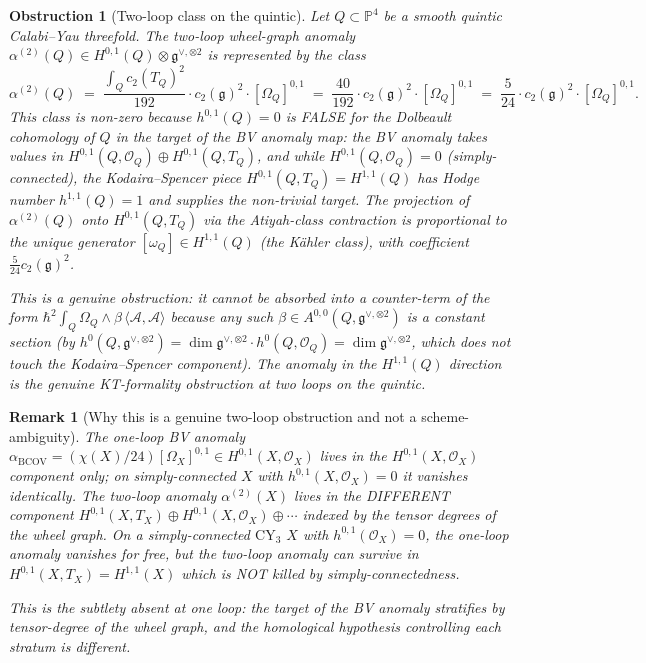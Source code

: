 \documentclass[11pt]{article}
\newtheorem{remark}[theorem]{Remark}
\newtheorem{obstruction}[theorem]{Obstruction}
\providecommand{\CY}{\mathrm{CY}}
\providecommand{\BCOV}{\mathrm{BCOV}}
\providecommand{\Om}{\Omega}
\providecommand{\cA}{\mathcal{A}}
\providecommand{\cO}{\mathcal{O}}
\providecommand{\fg}{\mathfrak{g}}
\begin{document}
\begin{obstruction}[Two-loop class on the quintic]
\label{obs:two-loop-quintic}
\ClaimStatusTheorem
Let $Q \subset \mathbb P^4$ be a smooth quintic Calabi--Yau
threefold.  The two-loop wheel-graph anomaly $\alpha^{(2)}(Q) \in
H^{0,1}(Q) \otimes \fg^{\vee, \otimes 2}$ is represented by the
class
\[
  \alpha^{(2)}(Q) \;=\; \frac{\int_Q c_2(T_Q)^2}{192} \cdot
    c_2(\fg)^2 \cdot [\Om_Q]^{0,1}  \;=\; \frac{40}{192} \cdot
    c_2(\fg)^2 \cdot [\Om_Q]^{0,1} \;=\; \frac{5}{24} \cdot
    c_2(\fg)^2 \cdot [\Om_Q]^{0,1}.
\]
This class is \emph{non-zero} because $h^{0,1}(Q) = 0$ is FALSE for
the Dolbeault cohomology of $Q$ \emph{in the target of the BV
anomaly map}:  the BV anomaly takes values in
$H^{0,1}(Q, \cO_Q)  \oplus H^{0,1}(Q, T_Q)$, and while
$H^{0,1}(Q, \cO_Q) = 0$ (simply-connected), the Kodaira--Spencer
piece $H^{0,1}(Q, T_Q) = H^{1,1}(Q)$ has Hodge number
$h^{1,1}(Q) = 1$ and supplies the non-trivial target.  The
projection of $\alpha^{(2)}(Q)$ onto $H^{0,1}(Q, T_Q)$ via the
Atiyah-class contraction is proportional to the unique generator
$[\omega_Q] \in H^{1,1}(Q)$ (the K\"ahler class), with coefficient
$\tfrac{5}{24} c_2(\fg)^2$.

This is a genuine obstruction:  it cannot be absorbed into a
counter-term of the form $\hbar^2 \int_Q \Om_Q \wedge \beta\,
\langle \cA, \cA\rangle$ because any such $\beta \in A^{0,0}(Q,
\fg^{\vee, \otimes 2})$ is a \emph{constant} section (by
$h^0(Q, \fg^{\vee, \otimes 2}) = \dim \fg^{\vee, \otimes 2} \cdot
h^0(Q, \cO_Q) = \dim \fg^{\vee, \otimes 2}$, which does not touch
the Kodaira--Spencer component).  The anomaly in the
$H^{1,1}(Q)$ direction is the genuine KT-formality obstruction at
two loops on the quintic.
\end{obstruction}

\begin{remark}[Why this is a genuine two-loop obstruction and not a
scheme-ambiguity]
\label{rem:genuine-two-loop-obstruction}
The one-loop BV anomaly $\alpha_\BCOV = (\chi(X)/24) [\Om_X]^{0,1}
\in H^{0,1}(X, \cO_X)$ lives in the $H^{0,1}(X, \cO_X)$ component
only; on simply-connected $X$ with $h^{0,1}(X, \cO_X) = 0$ it
vanishes identically.  The two-loop anomaly
$\alpha^{(2)}(X)$ lives in the DIFFERENT component
$H^{0,1}(X, T_X) \oplus H^{0,1}(X, \cO_X) \oplus \cdots$ indexed by
the tensor degrees of the wheel graph.  On a simply-connected $\CY_3$
$X$ with $h^{0,1}(\cO_X) = 0$, the one-loop anomaly vanishes for
free, but the two-loop anomaly can survive in $H^{0,1}(X, T_X) =
H^{1,1}(X)$ which is NOT killed by simply-connectedness.

This is the subtlety absent at one loop:  the target of the BV
anomaly stratifies by tensor-degree of the wheel graph, and the
homological hypothesis controlling each stratum is different.
\end{remark}
\end{document}
